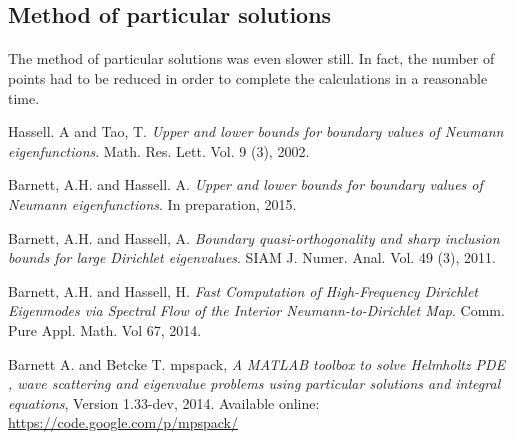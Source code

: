 \documentclass{article}
\begin{document}
\subsection{Method of particular solutions}
\paragraph{}
The method of particular solutions was even slower still.
In fact, the number of points had to be reduced in order to complete the calculations in a reasonable time. \\

\begin{thebibliography}{9}

Hassell. A and Tao, T.
\textsl{Upper and lower bounds for boundary values of Neumann eigenfunctions}.
Math. Res. Lett. Vol. 9 (3), 2002. %

Barnett, A.H. and Hassell. A.
\textsl{Upper and lower bounds for boundary values of Neumann eigenfunctions}.
In preparation, 2015.

Barnett, A.H. and Hassell, A.
\textsl{Boundary quasi-orthogonality and sharp inclusion bounds for large Dirichlet eigenvalues}.
SIAM J. Numer. Anal. Vol. 49 (3), 2011.

Barnett, A.H. and Hassell, H.
\textsl{Fast Computation of High-Frequency Dirichlet Eigenmodes via Spectral Flow of the Interior Neumann-to-Dirichlet Map}.
Comm. Pure Appl. Math. Vol 67, 2014.

Barnett A. and Betcke T.
mpspack,
\textsl{A MATLAB toolbox to solve Helmholtz PDE , wave scattering and eigenvalue problems using particular solutions and integral equations},
Version 1.33-dev, 2014.
Available online: \url{https://code.google.com/p/mpspack/}

\end{thebibliography}
\end{document}
